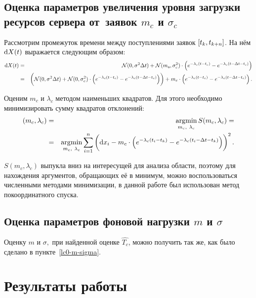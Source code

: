 \documentclass[a4paper,10pt]{article}
\DeclareMathOperator*{\argmin}{\arg\!\min}
\begin{document}
\subsection{Оценка параметров увеличения уровня загрузки ресурсов сервера %
от~заявок $m_c$ и $\sigma_c$}
Рассмотрим промежуток времени между поступлениями заявок $\sbr{t_k, t_{k+n}}$. 
На нём $\dif X(t)$ выражается следующим образом:
\begin{eqnarray*}
\dif X(t) 
  & = & \mathcal{N}(0, \sigma^2 \Delta t) + 
      \mathcal{N}(m_c, \sigma_c^2) \cdot 
        \del{e^{-\lambda_c(t - t_c)} - e^{-\lambda_c(t - \Delta t - t_c)}} \\
  & = & \del{
      \mathcal{N}(0, \sigma^2 \Delta t) + 
      \mathcal{N}(0, \sigma_c^2) \cdot 
        \del{e^{-\lambda_c(t - t_c)} - e^{-\lambda_c(t - \Delta t - t_c)}}} +
      m_c \cdot 
        \del{e^{-\lambda_c(t - t_c)} - e^{-\lambda_c(t - \Delta t - t_c)}}.
\end{eqnarray*}

Оценим $m_c$ и $\lambda_c$ методом наименьших квадратов.
Для этого необходимо минимизировать сумму квадратов отклонений:
\begin{eqnarray*}
\del{m_c, \lambda_c} 
  & = & \argmin\limits_{m_c,\ \lambda_c} S(m_c, \lambda_c) = \\
  & = & \argmin\limits_{m_c,\ \lambda_c} \sum\limits_{i=1}^{n} 
    \del{\dif x_i - m_c \cdot 
      \del{e^{-\lambda_c(t_i - t_k)} - 
           e^{-\lambda_c(t_i - \Delta t - t_k)}}}^2.
\end{eqnarray*}

$S(m_c, \lambda_c)$ выпукла вниз на интересущей для анализа области, 
поэтому для нахождения аргументов, обращающих её в минимум, 
можно воспользоваться численными методами минимизации, в данной работе
был использован метод покоординатного спуска.

\subsection{Оценка параметров фоновой нагрузки $m$ и $\sigma$}
Оценку $m$ и $\sigma,$ при найденной оценке $\widehat{T_c}$, можно 
получить так же, как было сделано в пункте~\ref{lc0-m-sigma}.

\section{Результаты работы}
\end{document}

